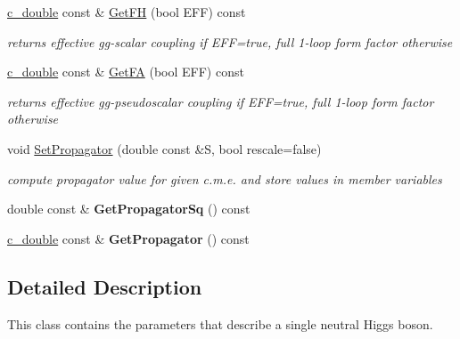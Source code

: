 \begin{DoxyCompactItemize}
\item 
\hypertarget{classHiggsBoson_af9055e140206943efe94b55ea76c1632}{}\hyperlink{Global_8h_af390c6bd8192faf6a1e2d875a1d10ca0}{c\+\_\+double} const \& \hyperlink{classHiggsBoson_af9055e140206943efe94b55ea76c1632}{Get\+F\+H} (bool E\+F\+F) const \label{classHiggsBoson_af9055e140206943efe94b55ea76c1632}

\begin{DoxyCompactList}\small\item\em returns effective gg-\/scalar coupling if E\+F\+F=true, full 1-\/loop form factor otherwise \end{DoxyCompactList}\item 
\hypertarget{classHiggsBoson_a8af3de930fb155b566956ab7c0457e29}{}\hyperlink{Global_8h_af390c6bd8192faf6a1e2d875a1d10ca0}{c\+\_\+double} const \& \hyperlink{classHiggsBoson_a8af3de930fb155b566956ab7c0457e29}{Get\+F\+A} (bool E\+F\+F) const \label{classHiggsBoson_a8af3de930fb155b566956ab7c0457e29}

\begin{DoxyCompactList}\small\item\em returns effective gg-\/pseudoscalar coupling if E\+F\+F=true, full 1-\/loop form factor otherwise \end{DoxyCompactList}\item 
void \hyperlink{classHiggsBoson_afebe4ad11ea2cbc2ec0ed1b94759c293}{Set\+Propagator} (double const \&S, bool rescale=false)
\begin{DoxyCompactList}\small\item\em compute propagator value for given c.\+m.\+e. and store values in member variables \end{DoxyCompactList}\item 
\hypertarget{classHiggsBoson_a3b836f00cee69f41cd04dd61e86bc4ab}{}double const \& {\bfseries Get\+Propagator\+Sq} () const \label{classHiggsBoson_a3b836f00cee69f41cd04dd61e86bc4ab}

\item 
\hypertarget{classHiggsBoson_abc21bb217a9a176025516e429a6c25ee}{}\hyperlink{Global_8h_af390c6bd8192faf6a1e2d875a1d10ca0}{c\+\_\+double} const \& {\bfseries Get\+Propagator} () const \label{classHiggsBoson_abc21bb217a9a176025516e429a6c25ee}

\end{DoxyCompactItemize}


\subsection{Detailed Description}
This class contains the parameters that describe a single neutral Higgs boson. 

